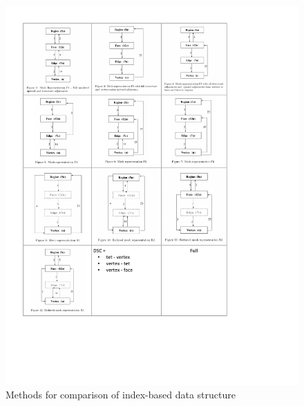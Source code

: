 \documentclass{scrartcl}
\begin{document}
\begin{figure}
	\includegraphics[scale=0.98]{../DSC}
	\caption{Methods for comparison of index-based data structure \cite{Garimella2002}}
	\label{fig:methods}
\end{figure}



\end{document}
